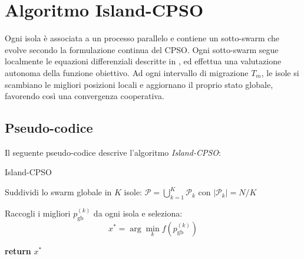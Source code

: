 \documentclass{article}
\begin{document}
\section{Algoritmo Island-CPSO}

Ogni isola è associata a un processo parallelo e contiene un sotto-swarm che evolve secondo la 
formulazione continua del CPSO. Ogni sotto-swarm segue localmente le equazioni differenziali descritte 
in \cite{Ricciardello2020}, ed effettua una valutazione autonoma della funzione obiettivo. Ad ogni 
intervallo di migrazione $T_m$, le isole si scambiano le migliori posizioni locali e aggiornano il 
proprio stato globale, favorendo così una convergenza cooperativa.

\subsection{Pseudo-codice}

Il seguente pseudo-codice descrive l’algoritmo \textit{Island-CPSO}:

\begin{algorithm}[H]
\caption{Island-CPSO}

Suddividi lo swarm globale in $K$ isole: $\mathcal{P} = \bigcup_{k=1}^K \mathcal{P}_k$ con $|\mathcal{P}_k| = N/K$\\


Raccogli i migliori $p_{\text{gb}}^{(k)}$ da ogni isola e seleziona:
\[
x^\ast = \arg\min_{k} f(p_{\text{gb}}^{(k)})
\]

\textbf{return} $x^\ast$
\end{algorithm}
\end{document}
